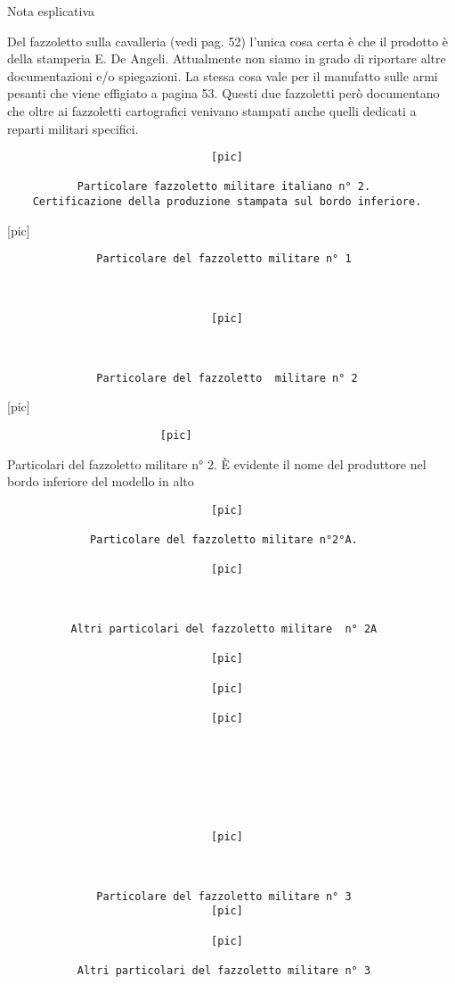 Nota esplicativa

Del fazzoletto sulla cavalleria (vedi pag. 52) l'unica cosa certa è che
il prodotto è della stamperia E. De Angeli. Attualmente non siamo in
grado di riportare altre documentazioni e/o spiegazioni. La stessa cosa
vale per il manufatto sulle armi pesanti che viene effigiato a pagina
53. Questi due fazzoletti però documentano che oltre ai fazzoletti
cartografici venivano stampati anche quelli dedicati a reparti militari
specifici.

\begin{verbatim}
                                [pic]

           Particolare fazzoletto militare italiano n° 2.
    Certificazione della produzione stampata sul bordo inferiore.
\end{verbatim}

{[}pic{]}

\begin{verbatim}
              Particolare del fazzoletto militare n° 1



                                [pic]



              Particolare del fazzoletto  militare n° 2
\end{verbatim}

{[}pic{]}

\begin{verbatim}
                        [pic]
\end{verbatim}

Particolari del fazzoletto militare n° 2. È evidente il nome del
produttore nel bordo inferiore del modello in alto

\begin{verbatim}
                                [pic]

             Particolare del fazzoletto militare n°2°A.

                                [pic]



          Altri particolari del fazzoletto militare  n° 2A

                                [pic]

                                [pic]

                                [pic]







                                [pic]



              Particolare del fazzoletto militare n° 3
                                [pic]

                                [pic]

           Altri particolari del fazzoletto militare n° 3
\end{verbatim}

